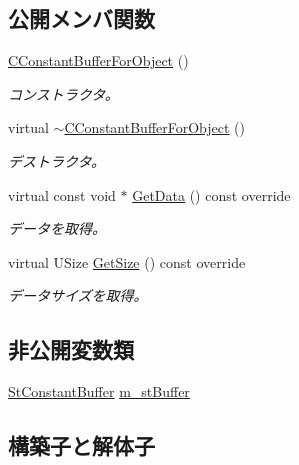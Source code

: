 \subsection*{公開メンバ関数}
\begin{DoxyCompactItemize}
\item 
\hyperlink{class_c_constant_buffer_for_object_a41e7fd82a1adb51310d29dd16769d0a1}{C\+Constant\+Buffer\+For\+Object} ()
\begin{DoxyCompactList}\small\item\em コンストラクタ。 \end{DoxyCompactList}\item 
virtual \hyperlink{class_c_constant_buffer_for_object_a5249e7edc97e8f4fc901e880e2bd0059}{$\sim$\+C\+Constant\+Buffer\+For\+Object} ()
\begin{DoxyCompactList}\small\item\em デストラクタ。 \end{DoxyCompactList}\item 
virtual const void $\ast$ \hyperlink{class_c_constant_buffer_for_object_aa13289af40c27707fb174a5b3afbdf1b}{Get\+Data} () const  override
\begin{DoxyCompactList}\small\item\em データを取得。 \end{DoxyCompactList}\item 
virtual U\+Size \hyperlink{class_c_constant_buffer_for_object_a328586af4370d221ada7b270f9f4b8db}{Get\+Size} () const  override
\begin{DoxyCompactList}\small\item\em データサイズを取得。 \end{DoxyCompactList}\end{DoxyCompactItemize}
\subsection*{非公開変数類}
\begin{DoxyCompactItemize}
\item 
\hyperlink{struct_c_constant_buffer_for_object_1_1_st_constant_buffer}{St\+Constant\+Buffer} \hyperlink{class_c_constant_buffer_for_object_af80f6e3c636cac07ef26f291a005f979}{m\+\_\+st\+Buffer}
\end{DoxyCompactItemize}


\subsection{構築子と解体子}
\hypertarget{class_c_constant_buffer_for_object_a41e7fd82a1adb51310d29dd16769d0a1}{}
